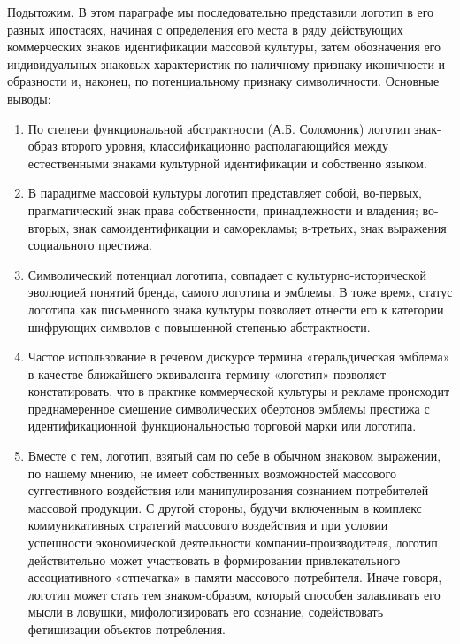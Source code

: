 Подытожим.
В этом параграфе мы последовательно представили логотип в его разных ипостасях,
  начиная с определения его места в ряду действующих коммерческих знаков идентификации массовой культуры,
  затем обозначения его индивидуальных знаковых характеристик по наличному признаку
  иконичности и образности и, наконец, по потенциальному признаку символичности. Основные выводы:
\begin{enumerate}
\item По степени функциональной абстрактности (А.Б. Соломоник) логотип знак-образ второго уровня, классификационно располагающийся между естественными знаками культурной идентификации и собственно языком.
\item В парадигме массовой культуры логотип представляет собой, во-первых, прагматический знак права собственности, принадлежности и владения; во-вторых, знак самоидентификации и саморекламы; в-третьих, знак выражения социального престижа.
\item Символический потенциал логотипа, совпадает с культурно\hyp{}исторической эволюцией понятий бренда, самого логотипа и эмблемы. В тоже время, статус логотипа как письменного знака культуры позволяет отнести его к категории шифрующих символов с повышенной степенью абстрактности.
\item Частое использование в речевом дискурсе термина «геральдическая эмблема» в качестве ближайшего эквивалента термину «логотип»  позволяет констатировать, что в практике коммерческой культуры и рекламе  происходит преднамеренное смешение символических обертонов эмблемы престижа с идентификационной функциональностью торговой марки или логотипа.
\item Вместе с тем, логотип, взятый сам по себе в обычном знаковом выражении, по нашему мнению, не имеет собственных возможностей массового суггестивного воздействия или манипулирования сознанием потребителей массовой продукции. С другой стороны, будучи включенным в комплекс коммуникативных стратегий массового воздействия и при условии успешности экономической деятельности компании-производителя, логотип действительно может участвовать в формировании привлекательного ассоциативного «отпечатка» в памяти массового потребителя. Иначе говоря, логотип может стать тем знаком-образом, который способен залавливать его мысли в ловушки, мифологизировать его сознание, содействовать фетишизации объектов потребления.
\end{enumerate}

